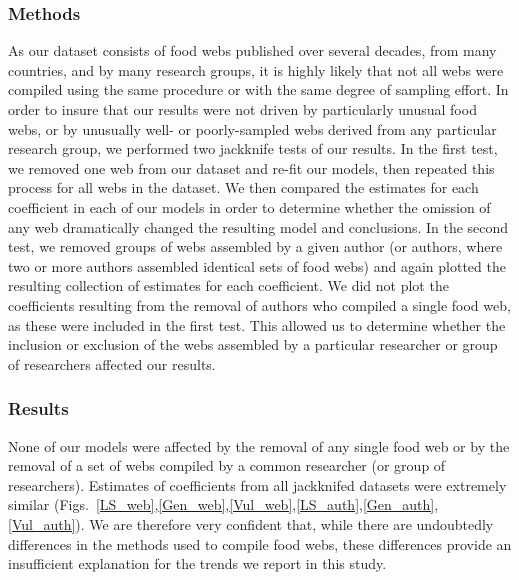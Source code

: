 \documentclass[12pt]{article}
\begin{document}
  \subsubsection*{Methods}
    As our dataset consists of food webs published over several decades, from 
    many countries, and by many research groups, it is highly likely that not
    all webs were compiled using the same procedure or with the same degree of
    sampling effort. In order to insure that our results were not driven by
    particularly unusual food webs, or by unusually well- or poorly-sampled webs 
    derived from any particular research group, we performed two jackknife tests of our 
    results. In the first test, we removed one web from our dataset and re-fit 
    our models, then repeated this process for all webs in the dataset. We then 
    compared the estimates for each coefficient in each of our models in order to 
    determine whether the omission of any web dramatically changed the resulting 
    model and conclusions. In the second test, we removed groups of webs assembled by a given 
    author (or authors, where two or more authors assembled identical sets of 
    food webs) and again plotted the resulting collection of estimates for each
    coefficient. We did not plot the coefficients resulting from the removal of
    authors who compiled a single food web, as these were included in the first
    test. This allowed us to determine whether the inclusion or exclusion
    of the webs assembled by a particular researcher or group of researchers
    affected our results.

  \subsubsection*{Results}

    None of our models were affected by the removal of any single food web
    or by the removal of a set of webs compiled by a common researcher (or group of
    researchers).
    Estimates of coefficients from all jackknifed datasets were extremely
    similar (Figs.~\ref{LS_web},\ref{Gen_web},\ref{Vul_web},\ref{LS_auth},\ref{Gen_auth},\ref{Vul_auth}). 
    We are therefore very confident that, while there are undoubtedly differences 
    in the methods used to compile food webs, these differences provide an
    insufficient explanation for the trends we report in this study.

\newpage
\end{document}
